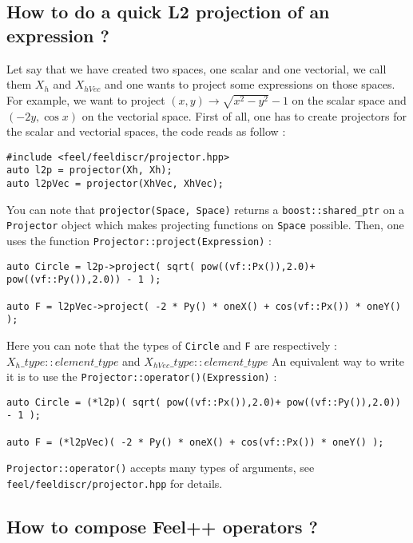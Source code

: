 \subsection{How to do a quick L2 projection of an expression ?}
Let say that we have created two spaces, one scalar and one vectorial, we call them $\displaystyle{X_h}$ and $\displaystyle{X_{hVec}}$ and one wants to project some expressions on those spaces. \newline \newline
For example, we want to project $\displaystyle{(x,y) \rightarrow \sqrt{x^2 - y^2} -1}$ on the scalar space and $\displaystyle{(-2y, \cos{x})}$ on the vectorial space.
First of all, one has to create projectors for the scalar and vectorial spaces, the code reads as follow :
\begin{lstlisting}
#include <feel/feeldiscr/projector.hpp>
auto l2p = projector(Xh, Xh);
auto l2pVec = projector(XhVec, XhVec);
\end{lstlisting}
You can note that \lstinline!projector(Space, Space)! returns a \lstinline!boost::shared_ptr! on a \lstinline!Projector! object which makes projecting functions on \lstinline!Space! possible.
\newline \newline
Then, one uses the function \lstinline!Projector::project(Expression)! :
\begin{lstlisting}
auto Circle = l2p->project( sqrt( pow((vf::Px()),2.0)+ pow((vf::Py()),2.0)) - 1 );

auto F = l2pVec->project( -2 * Py() * oneX() + cos(vf::Px()) * oneY() );
\end{lstlisting}
Here you can note that the types of \lstinline!Circle! and \lstinline!F! are respectively : $X_{h}\_type::element\_type$ and $X_{hVec}\_type::element\_type$
\newline
An equivalent way to write it is to use the \lstinline!Projector::operator()(Expression)! :
\begin{lstlisting}
auto Circle = (*l2p)( sqrt( pow((vf::Px()),2.0)+ pow((vf::Py()),2.0)) - 1 );

auto F = (*l2pVec)( -2 * Py() * oneX() + cos(vf::Px()) * oneY() );
\end{lstlisting}
\lstinline!Projector::operator()! accepts many types of arguments, see \lstinline!feel/feeldiscr/projector.hpp! for details.



\subsection{How to compose Feel++ operators ?}

